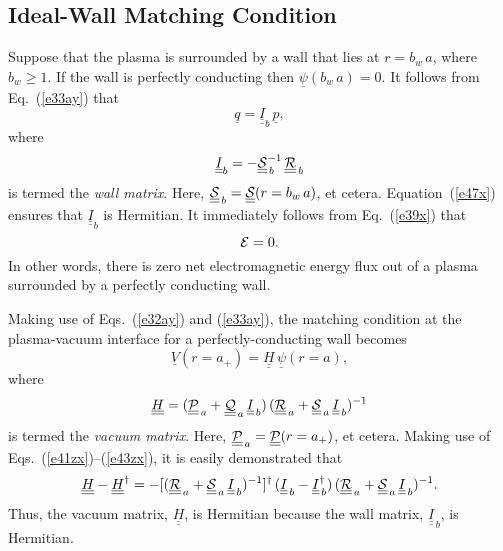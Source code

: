 \documentclass[12pt,prb,aps,notitlepage]{revtex4-1}
\begin{document}
\subsection{Ideal-Wall Matching Condition}
Suppose that the plasma is surrounded by a wall that  lies at $r=b_w\,a$, where $b_w\geq 1$. 
If the wall is perfectly conducting then  $\underline{\psi}(b_w\,a)=0$. 
It follows from Eq.~(\ref{e33ay}) that
\begin{equation}
\underline{q} = \underline{\underline{I}}_b\,\underline{p},
\end{equation}
where
\begin{equation}
 \underline{\underline{I}}_b=- \underline{\underline{\cal S}}_{\,b}^{-1}\,\underline{\underline{\cal R}}_{\,b}
 \end{equation}
 is termed the {\em wall matrix}.
 Here, $\underline{\underline{\cal S}}_{\,b}= \underline{\underline{\cal S}}(r=b_w\,a)$, et cetera. Equation~(\ref{e47x}) ensures that $ \underline{\underline{I}}_b$
 is Hermitian. It immediately follows from Eq.~(\ref{e39x}) that
 \begin{equation}\label{ezero}
 {\cal E}=0.
 \end{equation}
  In other words, there is zero net electromagnetic energy flux out of  a plasma
 surrounded by a perfectly conducting wall. 
 
  Making use of Eqs.~(\ref{e32ay}) and (\ref{e33ay}),  the matching condition at the plasma-vacuum interface  for a perfectly-conducting wall becomes 
 \begin{equation}\label{hdef}
 \underline{V}(r=a_+)= \underline{\underline{H}}\,\underline{\psi}(r=a),
 \end{equation}
 where 
 \begin{equation}
 \underline{\underline{H}}= (\underline{\underline{\cal P}}_{\,a}+\underline{\underline{\cal Q}}_{\,a}\,\underline{\underline{I}}_{\,b})\,(\underline{\underline{\cal R}}_{\,a}+\underline{\underline{\cal S}}_{\,a}\,\underline{\underline{I}}_{\,b})^{-1}
 \end{equation}
 is termed the {\em vacuum matrix}.
  Here, $\underline{\underline{\cal P}}_{\,a}= \underline{\underline{\cal P}}(r=a_+)$, et cetera. 
Making use of Eqs.~(\ref{e41zx})--(\ref{e43zx}), it is easily demonstrated that
 \begin{equation}\label{e53xx}
 \underline{\underline{H}}-\underline{\underline{H}}^\dag =- [(\underline{\underline{\cal R}}_{\,a}+\underline{\underline{\cal S}}_{\,a}\,\underline{\underline{I}}_{\,b})^{-1}]^{\dag}\,(\underline{\underline{I}}_{\,b} -\underline{\underline{I}}^\dag_{\,b})\,  (\underline{\underline{\cal R}}_{\,a}+\underline{\underline{\cal S}}_{\,a}\,\underline{\underline{I}}_{\,b})^{-1}.
\end{equation}
Thus,  the vacuum matrix, $\underline{\underline{H}}$, is Hermitian because  the wall matrix, $\underline{\underline{I}}_{\,b}$, is Hermitian. 
 
\end{document}
